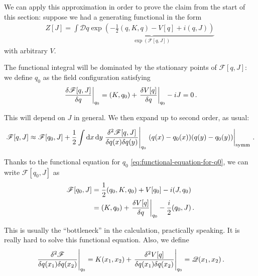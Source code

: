 \documentclass[main.tex]{subfiles}
\begin{document}
We can apply this approximation in order to prove the claim from the start of this section: suppose we had a generating functional in the form
%
\begin{align}
Z[J] = \int \mathcal{D}q \underbrace{\exp(- \frac{1}{2} (q, K, q) - V[q] + i (q, J))}_{\exp(\mathscr{F}[q, J])}
\,
\end{align}
%
with arbitrary \(V\).

The functional integral will be dominated by the stationary points of \(\mathscr{F}[q, J]\): we define \(q_0 \) as the field configuration satisfying
%
\begin{align} \label{eq:functional-equation-for-q0}
\eval{\fdv{\mathscr{F}[q, J]}{q}}_{q_0 } = (K, q_0 ) + \eval{\fdv{V[q]}{q}}_{q_0 } - iJ = 0
\,.
\end{align}

This will depend on \(J\) in general. We then expand up to second order, as usual: 
%
\begin{align}
\mathscr{F}[q, J] \approx \mathscr{F}[q_0 , J] + \frac{1}{2} \int \dd{x} \dd{y} \eval{\frac{ \delta^2 \mathscr{F}[q, J]}{ \delta q(x) \delta q(y) }}_{q_0 } \eval{(q(x) - q_0 (x)) (q(y) - q_0 (y))}_{\text{symm}}
\,.
\end{align}

Thanks to the functional equation for \(q_0 \) \eqref{eq:functional-equation-for-q0}, we can write \(\mathscr{F}[q_0 , J]\) as 
%
\begin{align}
\mathscr{F}[q_0 , J] &= \frac{1}{2} (q_0 , K, q_0 ) + V[q_0 ] - i (J, q_0 )  \\
&= (K, q_0 ) + \eval{\fdv{V[q]}{q}}_{q_0 } - \frac{i}{2}  (q_0, J) 
\,.
\end{align}
%

This is usually the ``bottleneck'' in the calculation, practically speaking. It is really hard to solve this functional equation.
Also, we define
%
\begin{align}
\eval{\frac{ \delta^2 \mathscr{F}}{ \delta q(x_1 ) \delta  q(x_2 )}}_{q_0 }
= K(x_1 , x_2 ) + \eval{\frac{ \delta^2 V[q]}{ \delta q(x_1 ) \delta q(x_2 )}}_{q_0 } = \mathscr{Q}(x_1 , x_2 )
\,.
\end{align}

\end{document}
